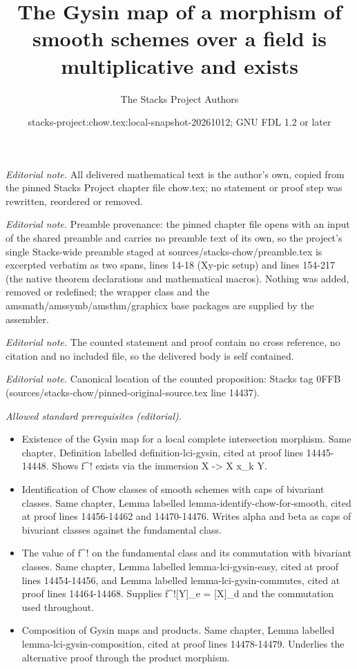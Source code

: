 \documentclass[10pt,a4paper]{amsart}
\title{The Gysin map of a morphism of smooth schemes over a field is multiplicative and exists}
\author{The Stacks Project Authors}
\date{stacks-project:chow.tex:local-snapshot-20261012; GNU FDL 1.2 or later}
\theoremstyle{plain}
\theoremstyle{definition}
\theoremstyle{remark}
\numberwithin{equation}{subsection}
\begin{document}
\maketitle
\noindent\textit{Editorial note.} All delivered mathematical text is the author's own, copied from the pinned Stacks Project chapter file chow.tex; no statement or proof step was rewritten, reordered or removed.\par\medskip
\noindent\textit{Editorial note.} Preamble provenance: the pinned chapter file opens with an input of the shared preamble and carries no preamble text of its own, so the project's single Stacks-wide preamble staged at sources/stacks-chow/preamble.tex is excerpted verbatim as two spans, lines 14-18 (Xy-pic setup) and lines 154-217 (the native theorem declarations and mathematical macros). Nothing was added, removed or redefined; the wrapper class and the amsmath/amssymb/amsthm/graphicx base packages are supplied by the assembler.\par\medskip
\noindent\textit{Editorial note.} The counted statement and proof contain no cross reference, no citation and no included file, so the delivered body is self contained.\par\medskip
\noindent\textit{Editorial note.} Canonical location of the counted proposition: Stacks tag 0FFB (sources/stacks-chow/pinned-original-source.tex line 14437).\par\medskip
\noindent\textit{Allowed standard prerequisites (editorial).}\begin{itemize}
\item Existence of the Gysin map for a local complete intersection morphism. Same chapter, Definition labelled definition-lci-gysin, cited at proof lines 14445-14448. Shows f\textasciicircum{}! exists via the immersion X -> X x\_k Y.
\item Identification of Chow classes of smooth schemes with caps of bivariant classes. Same chapter, Lemma labelled lemma-identify-chow-for-smooth, cited at proof lines 14456-14462 and 14470-14476. Writes alpha and beta as caps of bivariant classes against the fundamental class.
\item The value of f\textasciicircum{}! on the fundamental class and its commutation with bivariant classes. Same chapter, Lemma labelled lemma-lci-gysin-easy, cited at proof lines 14454-14456, and Lemma labelled lemma-lci-gysin-commutes, cited at proof lines 14464-14468. Supplies f\textasciicircum{}![Y]\_e = [X]\_d and the commutation used throughout.
\item Composition of Gysin maps and products. Same chapter, Lemma labelled lemma-lci-gysin-composition, cited at proof lines 14478-14479. Underlies the alternative proof through the product morphism.
\end{itemize}\medskip
\end{document}
